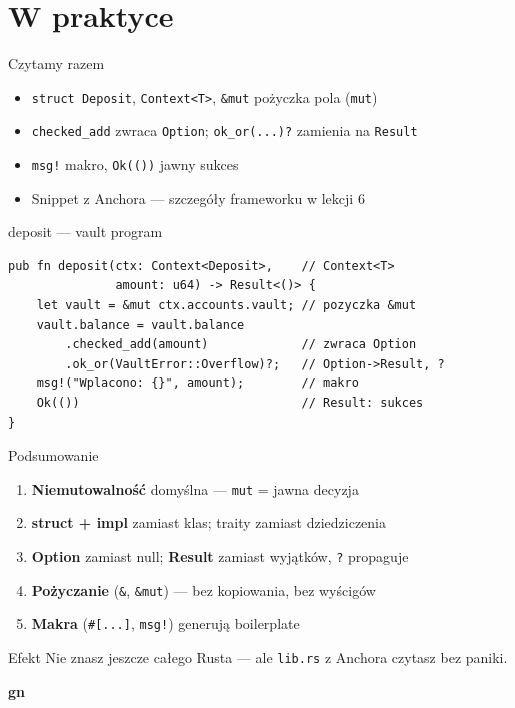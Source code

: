\section{W praktyce}

\begin{frame}[fragile]{Czytamy razem}
  \begin{itemize}
    \item \texttt{struct Deposit}, \texttt{Context<T>}, \texttt{\&mut} pożyczka pola (\texttt{mut})
    \item \texttt{checked\_add} zwraca \texttt{Option}; \texttt{ok\_or(...)?} zamienia na \texttt{Result}
    \item \texttt{msg!} makro, \texttt{Ok(())} jawny sukces
    \item \textcolor{stplmuted}{Snippet z Anchora --- szczegóły frameworku w lekcji 6}
  \end{itemize}
  \begin{block}{deposit --- vault program}
\begin{lstlisting}
pub fn deposit(ctx: Context<Deposit>,    // Context<T>
               amount: u64) -> Result<()> {
    let vault = &mut ctx.accounts.vault; // pozyczka &mut
    vault.balance = vault.balance
        .checked_add(amount)             // zwraca Option
        .ok_or(VaultError::Overflow)?;   // Option->Result, ?
    msg!("Wplacono: {}", amount);        // makro
    Ok(())                               // Result: sukces
}
\end{lstlisting}
  \end{block}
\end{frame}

\begin{frame}{Podsumowanie}
  \begin{enumerate}
    \item \textbf{Niemutowalność} domyślna --- \texttt{mut} = jawna decyzja
    \item \textbf{struct + impl} zamiast klas; traity zamiast dziedziczenia
    \item \textbf{Option} zamiast null; \textbf{Result} zamiast wyjątków, \texttt{?} propaguje
    \item \textbf{Pożyczanie} (\texttt{\&}, \texttt{\&mut}) --- bez kopiowania, bez wyścigów
    \item \textbf{Makra} (\texttt{\#[...]}, \texttt{msg!}) generują boilerplate
  \end{enumerate}
  \vspace{0.2cm}
  \begin{exampleblock}{Efekt}
    Nie znasz jeszcze całego Rusta --- ale \texttt{lib.rs} z Anchora czytasz bez paniki.
  \end{exampleblock}
\end{frame}

\begin{frame}[plain]
  \begin{center}
    \vfill
    {\Huge\bfseries\color{stplwhite} gn}
    \vfill
  \end{center}
\end{frame}


